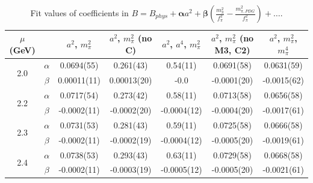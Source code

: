 \documentclass[12pt]{extarticle}
\begin{document}
\begin{table}[h!]
\begin{center}
\begin{tabular}{|c c|c|c|c|c|c|}
\hline
$\mu$ (GeV) &  & $a^2$, $m_\pi^2$& $a^2$, $m_\pi^2$ (no C)& $a^2$, $a^4$, $m_\pi^2$& $a^2$, $m_\pi^2$ (no M3, C2)& $a^2$, $m_\pi^2$, $m_\pi^4$\\
\hline
\multirow{2}{0.5in}{2.0} & $\alpha$ & 0.0694(55)& 0.261(43)& 0.54(11)& 0.0691(58)& 0.0631(59)\\
 & $\beta$ & 0.00011(11)& 0.00013(20)& -0.0& -0.0001(20)& -0.0015(62)\\
\hline
\multirow{2}{0.5in}{2.2} & $\alpha$ & 0.0717(54)& 0.273(42)& 0.58(11)& 0.0713(58)& 0.0656(58)\\
 & $\beta$ & -0.0002(11)& -0.0002(20)& -0.0004(12)& -0.0004(20)& -0.0017(61)\\
\hline
\multirow{2}{0.5in}{2.3} & $\alpha$ & 0.0731(53)& 0.281(43)& 0.59(11)& 0.0725(58)& 0.0666(58)\\
 & $\beta$ & -0.0002(11)& -0.0002(19)& -0.0004(12)& -0.0005(20)& -0.0019(61)\\
\hline
\multirow{2}{0.5in}{2.4} & $\alpha$ & 0.0738(53)& 0.293(43)& 0.63(11)& 0.0729(58)& 0.0668(58)\\
 & $\beta$ & -0.0002(11)& -0.0003(19)& -0.0005(12)& -0.0005(20)& -0.0021(61)\\
\hline
\end{tabular}
\caption{Fit values of coefficients in $B = B_{phys} + \mathbf{\alpha} a^2 + \mathbf{\beta}\left(\frac{m_\pi^2}{f_\pi^2}-\frac{m_{\pi,PDG}^2}{f_\pi^2}\right) + \ldots$.}
\end{center}
\end{table}




















\clearpage
\end{document}
